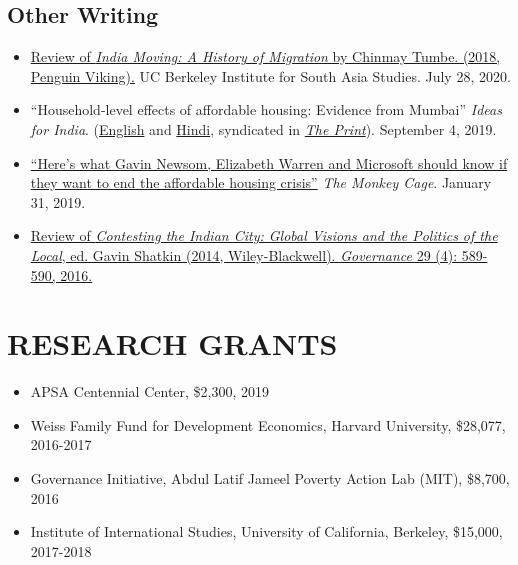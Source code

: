 \documentclass[11pt]{article}
\begin{document}
\subsection*{Other Writing}	
\begin{itemize}
\item[]\href{https://southasia.berkeley.edu/sites/default/files/shared/India_Center/India_Moving.pdf}{Review of \textit{India Moving: A History of Migration} by Chinmay Tumbe. (2018, Penguin Viking).}  UC Berkeley Institute for South Asia Studies. July 28, 2020.
\item[]``Household-level effects of affordable housing: Evidence from Mumbai''  \textit{Ideas for India}. (\href{https://www.ideasforindia.in/topics/poverty-inequality/household-level-effects-of-affordable-housing-evidence-from-mumbai.html}{English} and \href{https://www.ideasforindia.in/topics/poverty-inequality/household-level-effects-of-affordable-housing-evidence-from-mumbai-hindi.html}{Hindi}, syndicated in \href{https://theprint.in/opinion/mumbai-residents-win-govt-housing-lottery-and-spend-more-on-kids-education-jobs-study/290485/}{\textit{The Print}}). September 4, 2019.

\item[]\href{https://www.washingtonpost.com/news/monkey-cage/wp/2019/01/31/heres-what-gavin-newsom-elizabeth-warren-and-microsoft-should-know-if-want-to-end-the-affordable-housing-crisis/?tid=sm_tw_cage}{``Here's what Gavin Newsom, Elizabeth Warren and Microsoft should know if they want to end the affordable housing crisis''} \textit{The Monkey Cage}. January 31, 2019. 
\item[] \href{http://onlinelibrary.wiley.com/doi/10.1111/gove.12241/abstract}{Review of \textit{Contesting the Indian City: Global Visions and the Politics of the Local}, ed. Gavin Shatkin (2014, Wiley-Blackwell). \textit{Governance} 29 (4): 589-590, 2016.} \

\end{itemize}
\vspace{3mm}
\section*{RESEARCH GRANTS}

\begin{itemize}[nosep]
\item[] APSA Centennial Center, \$2,300, 2019

\item[] Weiss Family Fund for Development Economics, Harvard University, \$28,077, 2016-2017
\item[] Governance Initiative, Abdul Latif Jameel Poverty Action Lab (MIT), \$8,700, 2016	
	 
\item[]Institute of International Studies, University of California, Berkeley, \$15,000, 2017-2018
\end{itemize}
\end{document}
